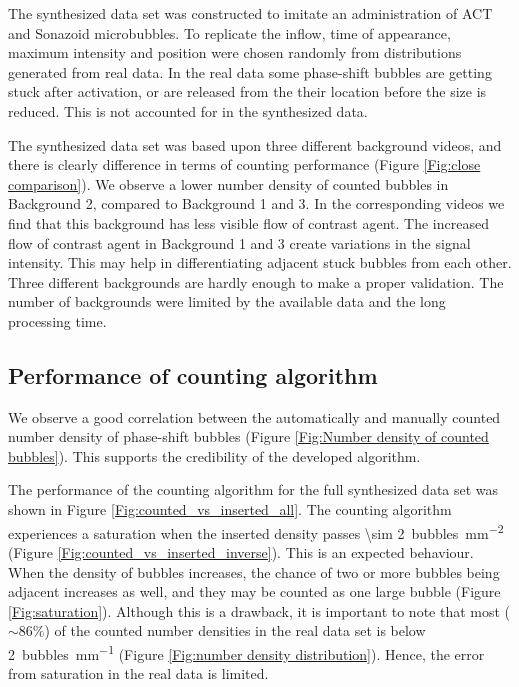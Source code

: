 The synthesized data set was constructed to imitate an administration of ACT\texttrademark{} and Sonazoid\texttrademark{} microbubbles. To replicate the inflow, time of appearance, maximum intensity and position were chosen randomly from distributions generated from real data. In the real data some phase-shift bubbles are getting stuck after activation, or are released from the their location before the size is reduced. This is not accounted for in the synthesized data. 

The synthesized data set was based upon three different background videos, and there is clearly difference in terms of counting performance (Figure \ref{Fig:close comparison}). We observe a lower number density of counted bubbles in Background 2, compared to Background 1 and 3. In the corresponding videos we find that this background has less visible flow of contrast agent. The increased flow of contrast agent in Background 1 and 3 create variations in the signal intensity. This may help in differentiating adjacent stuck bubbles from each other. Three different backgrounds are hardly enough to make a proper validation. The number of backgrounds were limited by the available data and the long processing  time. 

\subsection{Performance of counting algorithm}

We observe a good correlation between the automatically and manually counted number density of phase-shift bubbles (Figure \ref{Fig:Number density of counted bubbles}). This supports the credibility of the developed algorithm.

The performance of the counting algorithm for the full synthesized data set was shown in Figure \ref{Fig:counted_vs_inserted_all}. The counting algorithm experiences a saturation when the inserted density passes \SI{\sim 2}{bubbles\per\milli\meter\squared} (Figure \ref{Fig:counted_vs_inserted_inverse}). This is an expected behaviour. When the density of bubbles increases, the chance of two or more bubbles being adjacent increases as well, and they may be counted as one large bubble (Figure \ref{Fig:saturation}). Although this is a drawback, it is important to note that most ($\sim 86\%$) of the counted number densities in the real data set is below \SI{2}{bubbles\per\milli\meter} (Figure \ref{Fig:number density distribution}). Hence, the error from saturation in the real data is limited.


